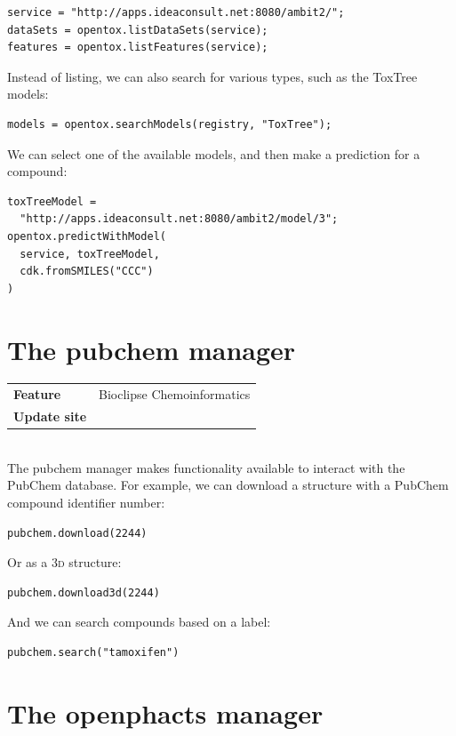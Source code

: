 \documentclass[a5paper, 10pt]{memoir}
\begin{document}
\begin{refsection}
\begin{Verbatim}
service = "http://apps.ideaconsult.net:8080/ambit2/";
dataSets = opentox.listDataSets(service);
features = opentox.listFeatures(service);
\end{Verbatim}
Instead of listing, we can also search for various types, such as the ToxTree
models\cite{patlewicz2008evaluation}:

\begin{Verbatim}
models = opentox.searchModels(registry, "ToxTree");
\end{Verbatim}
We can select one of the available models, and then make a prediction for a
compound:
\begin{Verbatim}
toxTreeModel =
  "http://apps.ideaconsult.net:8080/ambit2/model/3";
opentox.predictWithModel(
  service, toxTreeModel,
  cdk.fromSMILES("CCC")
)
\end{Verbatim}

\section{The pubchem manager}

\begin{tabular}{ll}
\textbf{Feature} & Bioclipse Chemoinformatics \\
\textbf{Update site} & \url{} \\
\end{tabular} \\

\noindent
The pubchem manager makes functionality available to interact with the PubChem
database. For example, we can download a structure with a
PubChem compound identifier number:

\begin{Verbatim}
pubchem.download(2244)
\end{Verbatim}
Or as a 3\textsc{d} structure:

\begin{Verbatim}
pubchem.download3d(2244)
\end{Verbatim}
And we can search compounds based on a label:

\begin{Verbatim}
pubchem.search("tamoxifen")
\end{Verbatim}

\section{The openphacts manager}


\end{refsection}
\end{document}
